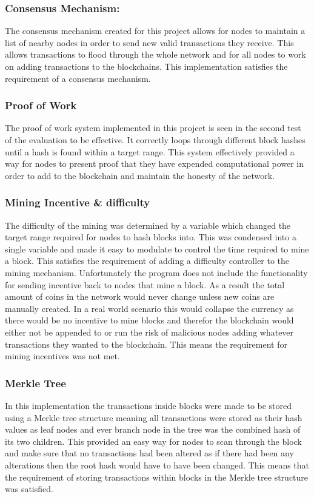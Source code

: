 \documentclass{l4proj}
\begin{document}
\subsubsection{Consensus Mechanism:}
The consensus mechanism created for this project allows for nodes to maintain a list of nearby nodes in order to send
new valid transactions they receive. This allows transactions to flood through the whole network and for all nodes to
work on adding transactions to the blockchains. This implementation satisfies the requirement of a consensus mechanism.
\subsubsection{Proof of Work}
The proof of work system implemented in this project is seen in the second test of the evaluation to be effective. It
correctly loops through different block hashes until a hash is found within a target range. This system effectively provided a way for nodes to present
proof that they have expended computational power in order to add to the blockchain and maintain the honesty of the 
network.
\subsubsection{Mining Incentive \& difficulty}
The difficulty of the mining was determined by a variable which changed the target range required for nodes to hash
blocks into. This was condensed into a single variable and made it easy to modulate to control the time required to 
mine a block. This satisfies the requirement of adding a difficulty controller to the mining mechanism. Unfortunately
the program does not include the functionality for sending incentive back to nodes that mine a block. As a result the
total amount of coins in the network would never change unless new coins are manually created. In a real world scenario
this would collapse the currency as there would be no incentive to mine blocks and therefor the blockchain would either
not be appended to or run the risk of malicious nodes adding whatever transactions they wanted to the blockchain. This
means the requirement for mining incentives was not met.
\subsubsection{Merkle Tree}
In this implementation the transactions inside blocks were made to be stored using a Merkle tree structure meaning
all transactions were stored as their hash values as leaf nodes and ever branch node in the tree was the combined hash
of its two children. This provided an easy way for nodes to scan through the block and make sure that no transactions
had been altered as if there had been any alterations then the root hash would have to have been changed. This means
that the requirement of storing transactions within blocks in the Merkle tree structure was satisfied.
\end{document}
